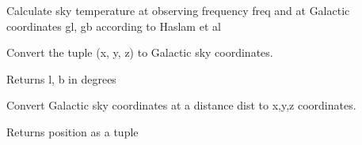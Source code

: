 \documentclass[letterpaper,10pt,english]{sphinxmanual}
\begin{document}

\begin{fulllineitems}
\label{\detokenize{module-level-docs:galacticops.tsky}}
\pysigstartsignatures
\pysiglinewithargsret
{}
{\sphinxparamcomma {}\sphinxparamcomma {}}
{}
\pysigstopsignatures
\sphinxAtStartPar
Calculate sky temperature at observing frequency freq and at Galactic coordinates gl, gb according to Haslam et al

\end{fulllineitems}


\begin{fulllineitems}
\label{\detokenize{module-level-docs:galacticops.xyz_to_lb}}
\pysigstartsignatures
\pysiglinewithargsret
{}
{\sphinxparamcomma {}\sphinxparamcomma {}}
{}
\pysigstopsignatures
\sphinxAtStartPar
Convert the tuple (x, y, z) to Galactic sky coordinates.

\sphinxAtStartPar
Returns l, b in degrees

\end{fulllineitems}


\begin{fulllineitems}
\label{\detokenize{module-level-docs:galacticops.lb_to_xyz}}
\pysigstartsignatures
\pysiglinewithargsret
{}
{\sphinxparamcomma {}\sphinxparamcomma {}}
{}
\pysigstopsignatures
\sphinxAtStartPar
Convert Galactic sky coordinates at a distance dist to x,y,z coordinates.

\sphinxAtStartPar
Returns position as a tuple

\end{fulllineitems}

\end{document}
